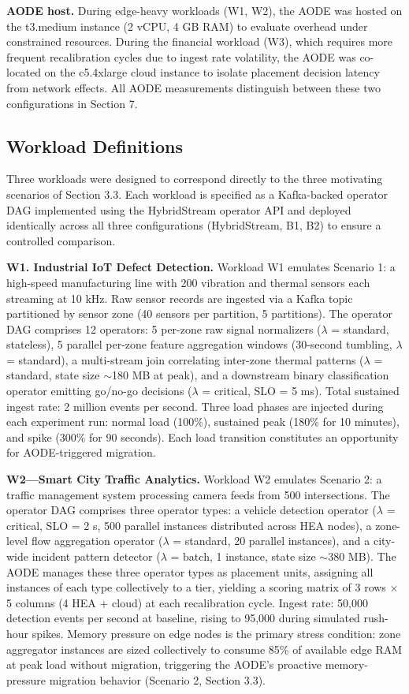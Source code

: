 \documentclass[preprint,review,12pt]{elsarticle}
\begin{document}
\textbf{AODE host.} During edge-heavy workloads (W1, W2), the AODE was hosted on the t3.medium instance (2 vCPU, 4 GB RAM) to evaluate overhead under constrained resources. During the financial workload (W3), which requires more frequent recalibration cycles due to ingest rate volatility, the AODE was co-located on the c5.4xlarge cloud instance to isolate placement decision latency from network effects. All AODE measurements distinguish between these two configurations in Section 7.

\subsection{Workload Definitions}\label{workload-definitions}

Three workloads were designed to correspond directly to the three motivating scenarios of Section 3.3. Each workload is specified as a Kafka-backed operator DAG implemented using the HybridStream operator API and deployed identically across all three configurations (HybridStream, B1, B2) to ensure a controlled comparison.

\textbf{W1. Industrial IoT Defect Detection.} Workload W1 emulates Scenario 1: a high-speed manufacturing line with 200 vibration and thermal sensors each streaming at 10 kHz. Raw sensor records are ingested via a Kafka topic partitioned by sensor zone (40 sensors per partition, 5 partitions). The operator DAG comprises 12 operators: 5 per-zone raw signal normalizers ($\lambda$ = standard, stateless), 5 parallel per-zone feature aggregation windows (30-second tumbling, $\lambda$ = standard), a multi-stream join correlating inter-zone thermal patterns ($\lambda$ = standard, state size $\sim$180 MB at peak), and a downstream binary classification operator emitting go/no-go decisions ($\lambda$ = critical, SLO = 5 ms). Total sustained ingest rate: 2 million events per second. Three load phases are injected during each experiment run: normal load (100\%), sustained peak (180\% for 10 minutes), and spike (300\% for 90 seconds). Each load transition constitutes an opportunity for AODE-triggered migration.

\textbf{W2—Smart City Traffic Analytics.} Workload W2 emulates Scenario 2: a traffic management system processing camera feeds from 500 intersections. The operator DAG comprises three operator types: a vehicle detection operator ($\lambda$ = critical, SLO = 2 s, 500 parallel instances distributed across HEA nodes), a zone-level flow aggregation operator ($\lambda$ = standard, 20 parallel instances), and a city-wide incident pattern detector ($\lambda$ = batch, 1 instance, state size $\sim$380 MB). The AODE manages these three operator types as placement units, assigning all instances of each type collectively to a tier, yielding a scoring matrix of 3 rows $\times$ 5 columns (4 HEA + cloud) at each recalibration cycle. Ingest rate: 50,000 detection events per second at baseline, rising to 95,000 during simulated rush-hour spikes. Memory pressure on edge nodes is the primary stress condition: zone aggregator instances are sized collectively to consume 85\% of available edge RAM at peak load without migration, triggering the AODE's proactive memory-pressure migration behavior (Scenario 2, Section 3.3).
\end{document}
